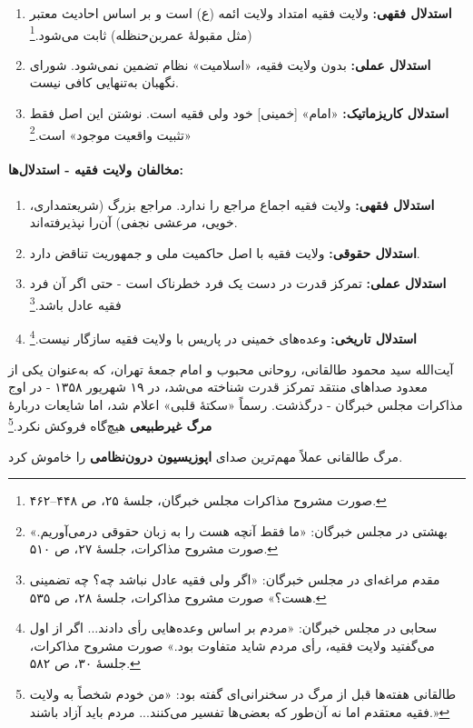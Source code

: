 \documentclass[12pt,a4paper]{book}
\newcommand{\keyword}[1]{\textbf{\textcolor{cPrimary}{#1}}}
\newcommand{\en}[1]{\lr{\textit{#1}}}
\begin{document}
\begin{enumerate}[label=\textcolor{cPrimary}{\bfseries\arabic*.}, rightmargin=2em]
    \item \textbf{استدلال فقهی:} ولایت فقیه امتداد ولایت ائمه (ع) است و بر اساس احادیث معتبر (مثل مقبولهٔ عمر‌بن‌حنظله) ثابت می‌شود.\footnote{صورت مشروح مذاکرات مجلس خبرگان، جلسهٔ ۲۵، ص ۴۴۸–۴۶۲.}
    
    \item \textbf{استدلال عملی:} بدون ولایت فقیه، «اسلامیت» نظام تضمین نمی‌شود. شورای نگهبان به‌تنهایی کافی نیست.
    
    \item \textbf{استدلال کاریزماتیک:} «امام» [خمینی] خود ولی فقیه است. نوشتن این اصل فقط «تثبیت واقعیت موجود» است.\footnote{بهشتی در مجلس خبرگان: «ما فقط آنچه هست را به زبان حقوقی درمی‌آوریم.» صورت مشروح مذاکرات، جلسهٔ ۲۷، ص ۵۱۰.}
\end{enumerate}

\paragraph{مخالفان ولایت فقیه - استدلال‌ها:}

\begin{enumerate}[label=\textcolor{cAccent}{\bfseries\arabic*.}, rightmargin=2em]
    \item \textbf{استدلال فقهی:} ولایت فقیه اجماع مراجع را ندارد. مراجع بزرگ (شریعتمداری، خویی، مرعشی نجفی) آن‌را نپذیرفته‌اند.
    
    \item \textbf{استدلال حقوقی:} ولایت فقیه با اصل حاکمیت ملی و جمهوریت تناقض دارد.
    
    \item \textbf{استدلال عملی:} تمرکز قدرت در دست یک فرد خطرناک است - حتی اگر آن فرد فقیه عادل باشد.\footnote{مقدم مراغه‌ای در مجلس خبرگان: «اگر ولی فقیه عادل نباشد چه؟ چه تضمینی هست؟» صورت مشروح مذاکرات، جلسهٔ ۲۸، ص ۵۳۵.}
    
    \item \textbf{استدلال تاریخی:} وعده‌های خمینی در پاریس با ولایت فقیه سازگار نیست.\footnote{سحابی در مجلس خبرگان: «مردم بر اساس وعده‌هایی رأی دادند... اگر از اول می‌گفتید ولایت فقیه، رأی مردم شاید متفاوت بود.» صورت مشروح مذاکرات، جلسهٔ ۳۰، ص ۵۸۲.}
\end{enumerate}

\begin{warningBox}
آیت‌الله سید محمود طالقانی، روحانی محبوب و امام جمعهٔ تهران، که به‌عنوان یکی از معدود صداهای منتقد تمرکز قدرت شناخته می‌شد، در ۱۹ شهریور ۱۳۵۸ - در اوج مذاکرات مجلس خبرگان - درگذشت. رسماً «سکتهٔ قلبی» اعلام شد، اما شایعات دربارهٔ \keyword{مرگ غیرطبیعی} هیچ‌گاه فروکش نکرد.\footnote{طالقانی هفته‌ها قبل از مرگ در سخنرانی‌ای گفته بود: «من خودم شخصاً به ولایت فقیه معتقدم اما نه آن‌طور که بعضی‌ها تفسیر می‌کنند... مردم باید آزاد باشند.» \en{Moin (1999), pp.\,218--219.}}

مرگ طالقانی عملاً مهم‌ترین صدای \keyword{اپوزیسیون درون‌نظامی} را خاموش کرد.
\end{warningBox}
\end{document}
